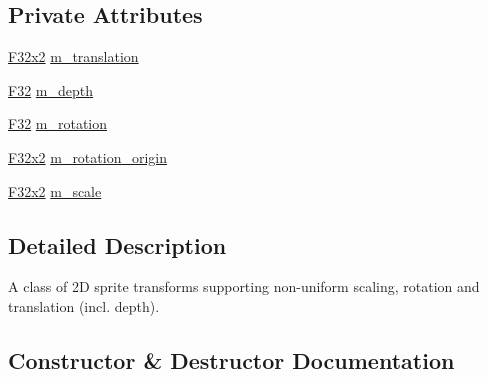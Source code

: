 \subsection*{Private Attributes}
\begin{DoxyCompactItemize}
\item 
\mbox{\hyperlink{namespacemage_aee4759dedc8def6c6dec26b5c7eddf29}{F32x2}} \mbox{\hyperlink{classmage_1_1_sprite_transform2_d_a6c34b66fa388291771fcdfe3eefd023f}{m\+\_\+translation}}
\item 
\mbox{\hyperlink{namespacemage_aa97e833b45f06d60a0a9c4fc22ae02c0}{F32}} \mbox{\hyperlink{classmage_1_1_sprite_transform2_d_a7878b5e80b281cfe5742c4e6c92e155b}{m\+\_\+depth}}
\item 
\mbox{\hyperlink{namespacemage_aa97e833b45f06d60a0a9c4fc22ae02c0}{F32}} \mbox{\hyperlink{classmage_1_1_sprite_transform2_d_aee9164ee3b04fa118abd6ff2207cde12}{m\+\_\+rotation}}
\item 
\mbox{\hyperlink{namespacemage_aee4759dedc8def6c6dec26b5c7eddf29}{F32x2}} \mbox{\hyperlink{classmage_1_1_sprite_transform2_d_ab17b11b5657de185a6c85fff8e492414}{m\+\_\+rotation\+\_\+origin}}
\item 
\mbox{\hyperlink{namespacemage_aee4759dedc8def6c6dec26b5c7eddf29}{F32x2}} \mbox{\hyperlink{classmage_1_1_sprite_transform2_d_a3975b9bfe1c8258983b3f896dde49763}{m\+\_\+scale}}
\end{DoxyCompactItemize}


\subsection{Detailed Description}
A class of 2D sprite transforms supporting non-\/uniform scaling, rotation and translation (incl. depth). 

\subsection{Constructor \& Destructor Documentation}
\mbox{\label{classmage_1_1_sprite_transform2_d_a71571da159a45c924746637e91cbddba}} 
